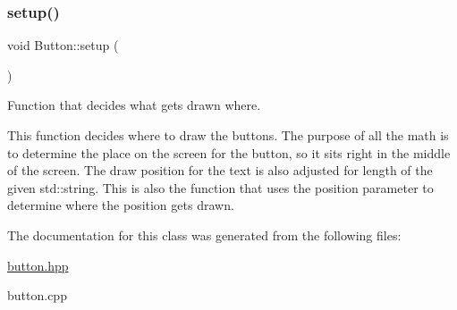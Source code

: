 \subsubsection{\texorpdfstring{setup()}{setup()}}
{\footnotesize\ttfamily void Button\+::setup (\begin{DoxyParamCaption}{ }\end{DoxyParamCaption})}



Function that decides what gets drawn where. 

This function decides where to draw the buttons. The purpose of all the math is to determine the place on the screen for the button, so it sits right in the middle of the screen. The draw position for the text is also adjusted for length of the given std\+::string. This is also the function that uses the position parameter to determine where the position gets drawn. 

The documentation for this class was generated from the following files\+:\begin{DoxyCompactItemize}
\item 
\hyperlink{button_8hpp}{button.\+hpp}\item 
button.\+cpp\end{DoxyCompactItemize}
